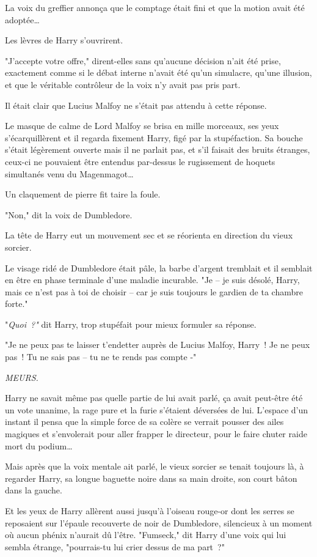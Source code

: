 La voix du greffier annonça que le comptage était fini et que la motion avait été adoptée…

Les lèvres de Harry s'ouvrirent.

"J'accepte votre offre," dirent-elles sans qu'aucune décision n'ait été prise, exactement comme si le débat interne n'avait été qu'un simulacre, qu'une illusion, et que le véritable contrôleur de la voix n'y avait pas pris part.

Il était clair que Lucius Malfoy ne s'était pas attendu à cette réponse.

Le masque de calme de Lord Malfoy se brisa en mille morceaux, ses yeux s'écarquillèrent et il regarda fixement Harry, figé par la stupéfaction. Sa bouche s'était légèrement ouverte mais il ne parlait pas, et s'il faisait des bruits étranges, ceux-ci ne pouvaient être entendus par-dessus le rugissement de hoquets simultanés venu du Magenmagot…

Un claquement de pierre fit taire la foule.

"Non," dit la voix de Dumbledore.

La tête de Harry eut un mouvement sec et se réorienta en direction du vieux sorcier.

Le visage ridé de Dumbledore était pâle, la barbe d'argent tremblait et il semblait en être en phase terminale d'une maladie incurable. "Je -- je suis désolé, Harry, mais ce n'est pas à toi de choisir -- car je suis toujours le gardien de ta chambre forte."

"\emph{Quoi~?"} dit Harry, trop stupéfait pour mieux formuler sa réponse.

"Je ne peux pas te laisser t'endetter auprès de Lucius Malfoy, Harry~! Je ne peux pas~! Tu ne sais pas -- tu ne te rends pas compte -"

\emph{MEURS.}

Harry ne savait même pas quelle partie de lui avait parlé, ça avait peut-être été un vote unanime, la rage pure et la furie s'étaient déversées de lui. L'espace d'un instant il pensa que la simple force de sa colère se verrait pousser des ailes magiques et s'envolerait pour aller frapper le directeur, pour le faire chuter raide mort du podium…

Mais après que la voix mentale ait parlé, le vieux sorcier se tenait toujours là, à regarder Harry, sa longue baguette noire dans sa main droite, son court bâton dans la gauche.

Et les yeux de Harry allèrent aussi jusqu'à l'oiseau rouge-or dont les serres se reposaient sur l'épaule recouverte de noir de Dumbledore, silencieux à un moment où aucun phénix n'aurait dû l'être. "Fumseck," dit Harry d'une voix qui lui sembla étrange, "pourrais-tu lui crier dessus de ma part~?"

